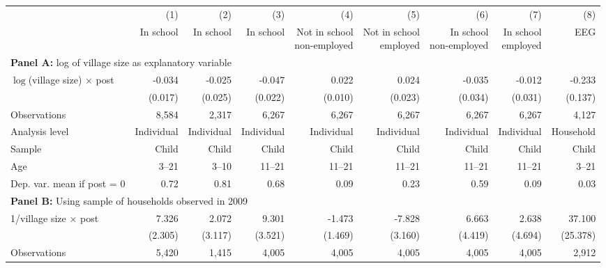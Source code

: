 \begin{center} \begin{threeparttable} \begin{tabular}{l*{8}{r}} \hline \hline 
                    &         (1)&         (2)&         (3)&         (4)&         (5)&         (6)&         (7)&         (8)\\
                    &   In school&   In school&   In school&\shortstack{Not in school\\non-employed}&\shortstack{Not in school\\employed}&\shortstack{In school\\non-employed}&\shortstack{In school\\employed}&         EEG\\
\hline \multicolumn{9}{l}{\textbf{Panel A:} log of village size as explanatory variable} \\
$\log$(village size) $\times$ post&      -0.034&      -0.025&      -0.047&       0.022&       0.024&      -0.035&      -0.012&      -0.233\\
                    &     (0.017)&     (0.025)&     (0.022)&     (0.010)&     (0.023)&     (0.034)&     (0.031)&     (0.137)\\
Observations        &       8,584&       2,317&       6,267&       6,267&       6,267&       6,267&       6,267&       4,127\\
Analysis level      &  Individual&  Individual&  Individual&  Individual&  Individual&  Individual&  Individual&   Household\\
Sample              &       Child&       Child&       Child&       Child&       Child&       Child&       Child&       Child\\
Age                 &       3--21&       3--10&      11--21&      11--21&      11--21&      11--21&      11--21&       3--21\\
Dep. var. mean if post = 0&        0.72&        0.81&        0.68&        0.09&        0.23&        0.59&        0.09&        0.03\\
\hline \multicolumn{9}{l}{\textbf{Panel B:} Using sample of households observed in 2009} \\
1/village size $\times$ post&       7.326&       2.072&       9.301&      -1.473&      -7.828&       6.663&       2.638&      37.100\\
                    &     (2.305)&     (3.117)&     (3.521)&     (1.469)&     (3.160)&     (4.419)&     (4.694)&    (25.378)\\
Observations        &       5,420&       1,415&       4,005&       4,005&       4,005&       4,005&       4,005&       2,912\\

\end{tabular}
\end{threeparttable}
\end{center}
